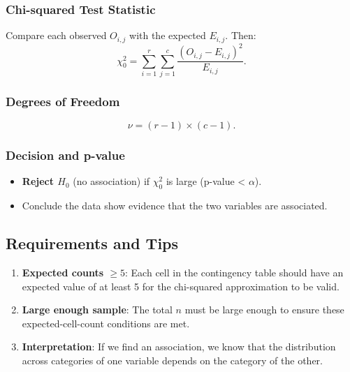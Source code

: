 \documentclass[10pt, total={6in, 8in}]{extarticle}
\begin{document}
\subsubsection{Chi-squared Test Statistic}

Compare each observed $O_{i,j}$ with the expected $E_{i,j}$. Then:
$$
    \chi^2_0
    = \sum_{i=1}^{r} \sum_{j=1}^{c} \frac{(O_{i,j} - E_{i,j})^2}{E_{i,j}}.
$$

\subsubsection{Degrees of Freedom}
$$
    \nu = (r - 1)\times(c - 1).
$$

\subsubsection{Decision and p-value}

\begin{itemize}
    \item \textbf{Reject $H_0$} (no association) if $\chi^2_0$ is large (p-value < $\alpha$).
    \item Conclude the data show evidence that the two variables are associated.
\end{itemize}

\subsection{Requirements and Tips}
\begin{enumerate}
    \item \textbf{Expected counts $\ge 5$}: Each cell in the contingency table should have an expected value of at least 5 for the chi-squared approximation to be valid.
    \item \textbf{Large enough sample}: The total $n$ must be large enough to ensure these expected-cell-count conditions are met.
    \item \textbf{Interpretation}: If we find an association, we know that the distribution across categories of one variable depends on the category of the other.
\end{enumerate}
\end{document}
